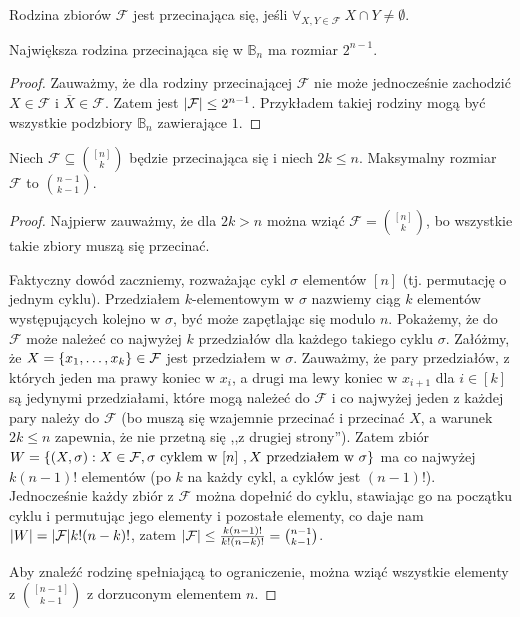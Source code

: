 \begin{definition}
	Rodzina zbiorów \(\mathcal F\) jest przecinająca się, jeśli \(\forall_{X, Y\in \mathcal F} \ X \cap Y \neq \emptyset\).
\end{definition}

\begin{theorem}
	Największa rodzina przecinająca się w \(\mathbb B_n\) ma rozmiar \(2^{n-1}\).
\end{theorem}
\begin{proof}
	Zauważmy, że dla rodziny przecinającej \(\mathcal F\) nie może jednocześnie
	zachodzić \(X\in\mathcal F\) i \(\overline X\in\mathcal F\). Zatem jest
	\(\card{\mathcal F}\le 2^{n-1}\). Przykładem takiej rodziny mogą być wszystkie
	podzbiory \(\mathbb B_n\) zawierające \(1\).
\end{proof}

\begin{theorem}
	Niech \(\mathcal F\subseteq \binom{[n]}{k}\) będzie przecinająca się i niech
	\(2k\le n\). Maksymalny rozmiar \(\mathcal F\) to \(\binom{n-1}{k-1}\).
\end{theorem}
\begin{proof}
	Najpierw zauważmy, że dla \(2k>n\) można wziąć \(\mathcal F = \binom{[n]}{k}\), bo
	wszystkie takie zbiory muszą się przecinać.

	Faktyczny dowód zaczniemy, rozważając cykl \(\sigma\) elementów
	\([n]\) (tj. permutację o jednym cyklu). Przedziałem \(k\)-elementowym w \(\sigma\)
	nazwiemy ciąg \(k\) elementów występujących kolejno w \(\sigma\), być może zapętlając
	się modulo \(n\). Pokażemy, że do \(\mathcal F\) może należeć co najwyżej \(k\)
	przedziałów dla każdego takiego cyklu \(\sigma\).
	Załóżmy, że \(X=\set{x_1,\ldots,x_k}\in\mathcal
	F\) jest przedziałem w \(\sigma.\) Zauważmy, że pary przedziałów, z których
	jeden ma prawy koniec w \(x_i\), a drugi ma lewy koniec w \(x_{i+1}\) dla \(i\in
	[k]\) są jedynymi przedziałami, które mogą należeć do \(\mathcal F\) i co
	najwyżej jeden z każdej pary należy do \(\mathcal F\) (bo muszą się wzajemnie
	przecinać i przecinać \(X\), a warunek \(2k\le n\) zapewnia, że
	nie przetną się ,,z drugiej strony''). Zatem zbiór
  \(W = \set{(X,\sigma) : X\in\mathcal F, \sigma \text{ cyklem w $[n]$ }, X \text{ przedziałem w
      $\sigma$}}\) ma co najwyżej \(k(n-1)!\) elementów (po \(k\) na każdy cykl, a cyklów jest \((n-1)!\)).
	Jednocześnie każdy zbiór z \(\mathcal F\) można dopełnić do cyklu, stawiając go
	na początku cyklu i permutując jego elementy i pozostałe elementy, co daje nam
	\(\card W = \card{\mathcal F}k!(n-k)!\), zatem \(\card{\mathcal F} \le
	\frac{k(n-1)!}{k!(n-k)!} = \binom{n-1}{k-1}\).

	Aby znaleźć rodzinę spełniającą to ograniczenie, można wziąć wszystkie elementy z
	\(\displaystyle\binom{[n-1]}{k-1}\) z dorzuconym elementem \(n\).
\end{proof}

